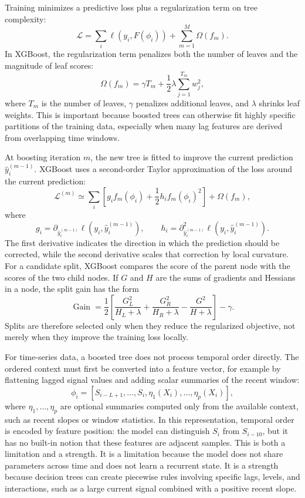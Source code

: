 Training minimizes a predictive loss plus a regularization term on tree
complexity:
\[
  \mathcal{L}
  =
  \sum_i \ell(y_i, F(\phi_i))
  +
  \sum_{m=1}^{M}\Omega(f_m).
\]
In XGBoost, the regularization term penalizes both the number of leaves and
the magnitude of leaf scores:
\[
  \Omega(f_m) = \gamma T_m + \frac{1}{2}\lambda\sum_{j=1}^{T_m} w_j^2 ,
\]
where \(T_m\) is the number of leaves, \(\gamma\) penalizes additional leaves,
and \(\lambda\) shrinks leaf weights. This is important because boosted trees
can otherwise fit highly specific partitions of the training data, especially
when many lag features are derived from overlapping time windows.

At boosting iteration \(m\), the new tree is fitted to improve the current
prediction \(\widehat{y}^{(m-1)}_i\). XGBoost uses a second-order Taylor
approximation of the loss around the current prediction:
\[
  \mathcal{L}^{(m)}
  \simeq
  \sum_i
  \left[
    g_i f_m(\phi_i)
    +
    \frac{1}{2}h_i f_m(\phi_i)^2
  \right]
  +
  \Omega(f_m),
\]
where
\[
  g_i =
  \partial_{\widehat{y}^{(m-1)}_i}
  \ell(y_i,\widehat{y}^{(m-1)}_i),
  \qquad
  h_i =
  \partial^2_{\widehat{y}^{(m-1)}_i}
  \ell(y_i,\widehat{y}^{(m-1)}_i).
\]
The first derivative indicates the direction in which the prediction should be
corrected, while the second derivative scales that correction by local
curvature. For a candidate split, XGBoost compares the score of the parent node
with the scores of the two child nodes. If \(G\) and \(H\) are the sums of
gradients and Hessians in a node, the split gain has the form
\[
  \operatorname{Gain}
  =
  \frac{1}{2}
  \left[
    \frac{G_L^2}{H_L+\lambda}
    +
    \frac{G_R^2}{H_R+\lambda}
    -
    \frac{G^2}{H+\lambda}
  \right]
  -
  \gamma .
\]
Splits are therefore selected only when they reduce the regularized objective,
not merely when they improve the training loss locally.

For time-series data, a boosted tree does not process temporal order directly.
The ordered context must first be converted into a feature vector, for example
by flattening lagged signal values and adding scalar summaries of the recent
window:
\[
  \phi_i =
  [S_{i-L+1},\ldots,S_i,\eta_1(X_i),\ldots,\eta_p(X_i)] ,
\]
where \(\eta_1,\ldots,\eta_p\) are optional summaries computed only from the
available context, such as recent slopes or window statistics. In this
representation, temporal order is encoded by feature position: the model can
distinguish \(S_i\) from \(S_{i-10}\), but it has no built-in notion that these
features are adjacent samples. This is both a limitation and a strength. It is a
limitation because the model does not share parameters across time and does not
learn a recurrent state. It is a strength because decision trees can create
piecewise rules involving specific lags, levels, and interactions, such as a
large current signal combined with a positive recent slope.


